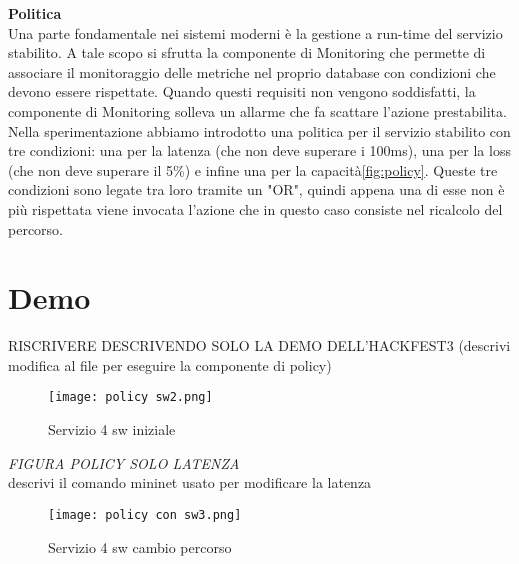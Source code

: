 \textbf{Politica}
\\Una parte fondamentale nei sistemi moderni è la gestione a run-time del servizio stabilito\cite{demo}.
A tale scopo si sfrutta la componente di Monitoring che permette di associare il monitoraggio delle metriche nel proprio database
con condizioni che devono essere rispettate.
Quando questi requisiti non vengono soddisfatti, la componente di Monitoring solleva un allarme che fa scattare l'azione prestabilita.
\\Nella sperimentazione abbiamo introdotto una politica per il servizio stabilito con tre condizioni: una per la latenza (che non deve superare i 100ms), una per la loss (che non deve superare il 5\%) 
e infine una per la capacità\ref{fig:policy}.
Queste tre condizioni sono legate tra loro tramite un "OR", quindi appena una di esse non è più rispettata viene invocata l'azione che in questo caso consiste nel ricalcolo del percorso.

\section{Demo}
RISCRIVERE DESCRIVENDO SOLO LA DEMO DELL'HACKFEST3 (descrivi modifica al file per eseguire la componente di policy)
\begin{figure}[h]
    \centering
    \texttt{[image: policy sw2.png]}
    \caption{Servizio 4 sw iniziale}
    \label{fig:sw4}
\end{figure}

\textit{FIGURA POLICY SOLO LATENZA}
\\descrivi il comando mininet usato per modificare la latenza
\begin{figure}[h]
    \centering
    \texttt{[image: policy con sw3.png]}
    \caption{Servizio 4 sw cambio percorso}
    \label{fig:sw4 dopo}
\end{figure}


